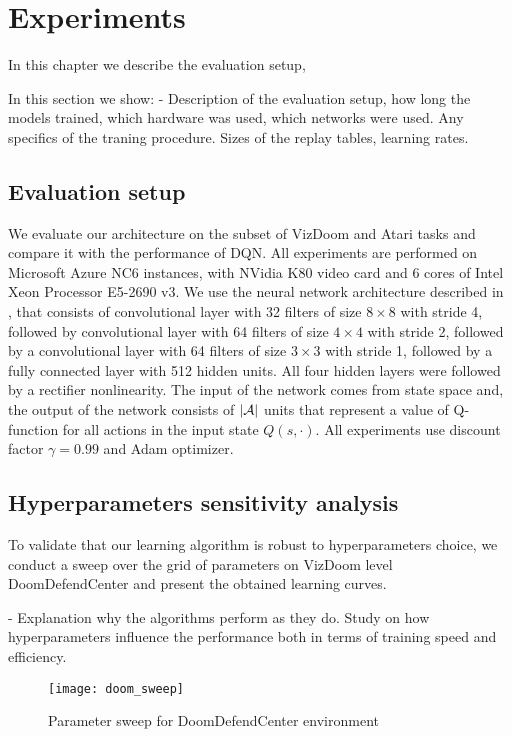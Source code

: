 \section{Experiments}

In this chapter we describe the evaluation setup,

In this section we show:
- Description of the evaluation setup, how long the models trained, which hardware was used,
which networks were used. Any specifics of the traning procedure. Sizes of the replay tables,
learning rates.

\subsection{Evaluation setup}

We evaluate our architecture on the subset of VizDoom and Atari tasks and compare it with the
performance of DQN. All experiments are performed on Microsoft Azure NC6 instances, with NVidia K80
video card and 6 cores of Intel Xeon Processor E5-2690 v3. We use the neural network architecture
described in \cite{NatureDQN}, that consists of convolutional layer with 32 filters of size $8
\times 8$ with stride 4, followed by convolutional layer with 64 filters of size $4 \times 4$ with
stride 2, followed by a convolutional layer with 64 filters of size $3 \times 3$ with stride 1,
followed by a fully connected layer with 512 hidden units. All four hidden layers were followed by
a rectifier nonlinearity. The input of the network comes from state space and,
the output of the network consists of $\left | \mathcal{A} \right |$ units that represent a value of Q-function
for all actions in the input state $Q(s, \cdot)$.
All experiments use discount factor $\gamma = 0.99$ and Adam optimizer.

\subsection{Hyperparameters sensitivity analysis}

To validate that our learning algorithm is robust to hyperparameters choice, we conduct a sweep
over the grid of parameters on VizDoom level DoomDefendCenter and present the obtained learning
curves.

- Explanation why the algorithms perform as they do. Study on how hyperparameters influence
the performance both in terms of training speed and efficiency.

\begin{figure}[h!]
\caption{Parameter sweep for DoomDefendCenter environment}
\texttt{[image: doom\_sweep]}
\end{figure}

